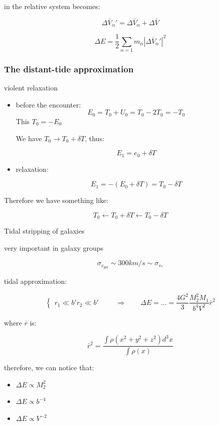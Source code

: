 in the relative system becomes:

$$
\Delta \bar V_\alpha' = \Delta \bar V_\alpha + \Delta \bar V
$$

$$
\Delta E = \dfrac 12 \sum_{\alpha = 1} m_\alpha |\Delta \bar V_\alpha'|^2
$$

\subsubsection{The distant-tide approximation}

violent relaxation

\begin{itemize}
    \item before the encounter: 
    $$
    E_0 = T_0 + U_0 = T_0 - 2 T_0 = - T_0
    $$
    This $T_0 = - E_0$

    We have $T_0 \to T_0 + \delta T$, thus:

    $$
    E_1 = e_0 + \delta T
    $$

    \item relaxation:
    
    $$
    E_1 = - (E_0 + \delta T) = T_0 - \delta T
    $$
\end{itemize}

Therefore we have something like:

$$
T_0 \longleftarrow T_0 + \delta T \longleftarrow T_0 - \delta T
$$

Tidal stripping of galaxies

very important in galaxy groups

$$
\sigma_{v_{gal}} \sim 300 km/s \sim \sigma_{v_*}
$$

tidal approximation:

$$
\begin{cases}
r_1 \ll b'
r_2 \ll b'
\end{cases}
\qquad \Rightarrow \qquad
\Delta E = ... = \dfrac {4 G^2}{3} \dfrac{M_2^2 M_1}{b^4 V^2} \bar r^2
$$

where $\bar r$ is:

$$
\bar r^2 = \dfrac{\int \rho(x^2 + y^2 + z^2) d^3 x}{\int \rho(x)}
$$

therefore, we can notice that:

\begin{itemize}
    \item $\Delta E \propto M_2^2$
    \item $\Delta E \propto b^{-4}$
    \item $\Delta E \propto V^{-2}$
\end{itemize}

